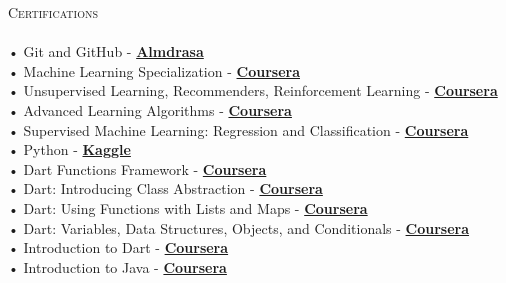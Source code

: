 \documentclass[a4paper]{article}
\newcommand{\lineunder} {
    \vspace*{-8pt} \\
    \hspace*{-18pt} \hrulefill \\
}
\newcommand{\header} [1] {
    {\hspace*{-18pt}\vspace*{6pt} \textsc{#1}}
    \vspace*{-6pt} \lineunder
}
\begin{document}
      \header{Certifications}
      \vspace{2mm}
      • Git and GitHub - \textbf{\href{https://almdrasa.com/certificate-verification/14AC69499-1454BFCF0-12722213C}{Almdrasa}}\\
\vspace*{1mm}
      • Machine Learning Specialization - \textbf{\href{https://coursera.org/verify/specialization/3BRYQRFUD5C6}{Coursera}}\\
\vspace*{1mm}
      • Unsupervised Learning, Recommenders, Reinforcement Learning - \textbf{\href{https://coursera.org/verify/B4NKPXD9UN9Z}{Coursera}}\\
\vspace*{1mm}
      • Advanced Learning Algorithms - \textbf{\href{https://coursera.org/verify/HM55XWLDYPA3}{Coursera}}\\
\vspace*{1mm}
      • Supervised Machine Learning: Regression and Classification - \textbf{\href{https://coursera.org/verify/XX8THJA26UTS}{Coursera}}\\
\vspace*{1mm}
      • Python - \textbf{\href{https://www.kaggle.com/learn/certification/mh0386/python}{Kaggle}}\\
\vspace*{1mm}
      • Dart Functions Framework - \textbf{\href{https://coursera.org/verify/X3R4PWA6F6DU}{Coursera}}\\
\vspace*{1mm}
      • Dart: Introducing Class Abstraction - \textbf{\href{https://coursera.org/verify/CBTJ62YWD3K7}{Coursera}}\\
\vspace*{1mm}
      • Dart: Using Functions with Lists and Maps - \textbf{\href{https://coursera.org/verify/XNCT9EVVDSN6}{Coursera}}\\
\vspace*{1mm}
      • Dart: Variables, Data Structures, Objects, and Conditionals - \textbf{\href{https://coursera.org/verify/ZPR9YGTJKDSM}{Coursera}}\\
\vspace*{1mm}
      • Introduction to Dart - \textbf{\href{https://coursera.org/verify/ZBJPMK8L47M2}{Coursera}}\\
\vspace*{1mm}
      • Introduction to Java - \textbf{\href{https://coursera.org/verify/UTPHVJYUDJV5}{Coursera}}\\
\end{document}
